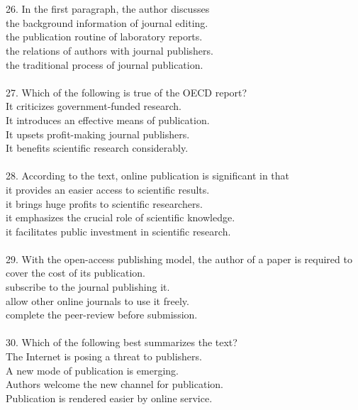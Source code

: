 \documentclass[a4paper]{ctexart}
\begin{document}
\\
\\
26.	In the first paragraph, the author discusses\\
[A] the background information of journal editing.\\
[B] the publication routine of laboratory reports.\\
[C] the relations of authors with journal publishers.\\
[D] the traditional process of journal publication.\\
\\
27.	Which of the following is true of the OECD report?\\
[A] It criticizes government-funded research.\\
[B] It introduces an effective means of publication.\\
[C] It upsets profit-making journal publishers.\\
[D] It benefits scientific research considerably.\\
\\
28.	According to the text, online publication is significant in that\\
[A] it provides an easier access to scientific results.\\
[B] it brings huge profits to scientific researchers.\\
[C] it emphasizes the crucial role of scientific knowledge.\\
[D] it facilitates public investment in scientific research.\\
\\
29.	With the open-access publishing model, the author of a paper is required to\\
[A] cover the cost of its publication.\\
[B] subscribe to the journal publishing it.\\
[C] allow other online journals to use it freely.\\
[D] complete the peer-review before submission.\\
\\
30.	Which of the following best summarizes the text?\\
[A] The Internet is posing a threat to publishers.\\
[B] A new mode of publication is emerging.\\
[C] Authors welcome the new channel for publication.\\
[D] Publication is rendered easier by online service.\\
\end{document}
